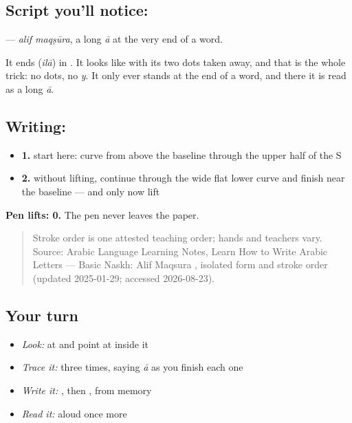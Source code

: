 \subsection*{Script you'll notice: }
\textbf{} — \emph{alif maqṣūra}, a long \emph{ā} at the very end of a word.

It ends \textbf{} (\emph{ilā}) in \textbf{ }. It looks like \textbf{} with its two dots taken away, and that is the whole trick: no dots, no \emph{y}. It only ever stands at the end of a word, and there it is read as a long \emph{ā}.

\subsection*{Writing: }

\begin{itemize}
\raggedright
  \item \textbf{1.} start here: curve from above the baseline through the upper half of the S
  \item \textbf{2.} without lifting, continue through the wide flat lower curve and finish near the baseline — and only now lift
\end{itemize}

\textbf{Pen lifts: 0.} The pen never leaves the paper.

\begin{quote}
Stroke order is one attested teaching order; hands and teachers vary. Source: Arabic Language Learning Notes, Learn How to Write Arabic Letters — Basic Naskh: Alif Maqsura , isolated form and stroke order (updated 2025-01-29; accessed 2026-08-23).
\end{quote}

\subsection*{Your turn}
\begin{itemize}
\raggedright
  \item \emph{Look:} at \textbf{ } and point at  inside it
  \item \emph{Trace it:}  three times, saying \emph{ā} as you finish each one
  \item \emph{Write it:} , then , from memory
  \item \emph{Read it:} \textbf{ } aloud once more
\end{itemize}

